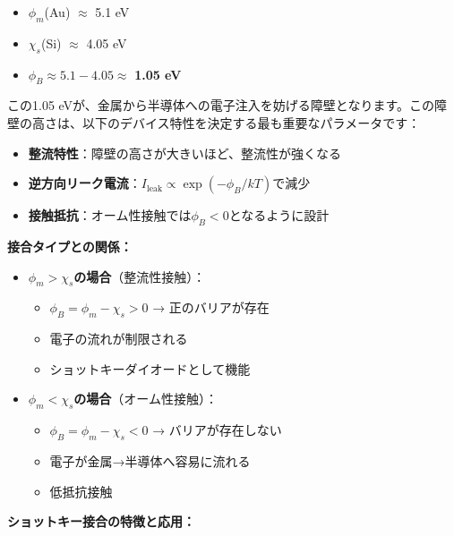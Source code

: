 \begin{itemize}
\item $\phi_m$(Au) $\approx$ 5.1 eV
\item $\chi_s$(Si) $\approx$ 4.05 eV
\item $\phi_B \approx 5.1 - 4.05 \approx$ \textbf{1.05 eV}
\end{itemize}

この1.05 eVが、金属から半導体への電子注入を妨げる障壁となります。この障壁の高さは、以下のデバイス特性を決定する最も重要なパラメータです：

\begin{itemize}
\item \textbf{整流特性}：障壁の高さが大きいほど、整流性が強くなる
\item \textbf{逆方向リーク電流}：$I_{\text{leak}} \propto \exp(-\phi_B/kT)$で減少
\item \textbf{接触抵抗}：オーム性接触では$\phi_B < 0$となるように設計
\end{itemize}

\textbf{接合タイプとの関係：}

\begin{itemize}
\item \textbf{$\phi_m > \chi_s$の場合}（整流性接触）：
\begin{itemize}
\item $\phi_B = \phi_m - \chi_s > 0$ → 正のバリアが存在
\item 電子の流れが制限される
\item ショットキーダイオードとして機能
\end{itemize}

\item \textbf{$\phi_m < \chi_s$の場合}（オーム性接触）：
\begin{itemize}
\item $\phi_B = \phi_m - \chi_s < 0$ → バリアが存在しない
\item 電子が金属→半導体へ容易に流れる
\item 低抵抗接触
\end{itemize}
\end{itemize}

\textbf{ショットキー接合の特徴と応用：}

